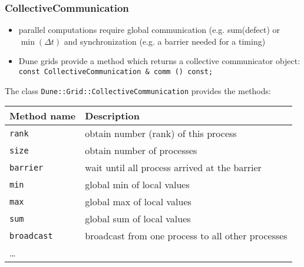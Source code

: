\begin{frame}[fragile]
  \frametitle<presentation>{CollectiveCommunication}
  \begin{itemize}
  \item parallel computations require global communication (e.g. sum(defect) or $\min(\Delta t)$
        and synchronization (e.g. a barrier needed for a timing)
  \item Dune grids provide a method which returns a collective communicator object:
    \lstinline!  const CollectiveCommunication & comm () const;!
  \end{itemize}

The class  \lstinline[basicstyle=\normalfont\ttfamily] !Dune::Grid::CollectiveCommunication! provides the methods:
 \begin{center}
    \scriptsize
    \begin{tabular}{l|l}
      \hline
      Method name & Description\\\hline
      \lstinline!rank! & obtain number (rank) of this process\\
      \lstinline!size! & obtain number of processes \\
      \lstinline!barrier! & wait until all process arrived at the barrier\\
      \lstinline!min! & global min of local values\\
      \lstinline!max! & global max of local values\\
      \lstinline!sum! & global sum of local values\\
      \lstinline!broadcast! & broadcast from one process to all other processes\\
      \dots\\
      \hline
    \end{tabular}
 \end{center}

\end{frame}

